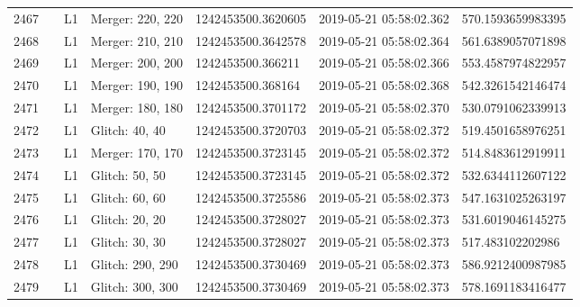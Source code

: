 \begin{longtable}{lllllll}
2467 &                                                    &       L1 &  Merger: 220, 220 &  1242453500.3620605 &  2019-05-21 05:58:02.362 &   570.1593659983395 \\
2468 &                                                    &       L1 &  Merger: 210, 210 &  1242453500.3642578 &  2019-05-21 05:58:02.364 &   561.6389057071898 \\
2469 &                                                    &       L1 &  Merger: 200, 200 &   1242453500.366211 &  2019-05-21 05:58:02.366 &   553.4587974822957 \\
2470 &                                                    &       L1 &  Merger: 190, 190 &   1242453500.368164 &  2019-05-21 05:58:02.368 &   542.3261542146474 \\
2471 &                                                    &       L1 &  Merger: 180, 180 &  1242453500.3701172 &  2019-05-21 05:58:02.370 &   530.0791062339913 \\
2472 &                                                    &       L1 &    Glitch: 40, 40 &  1242453500.3720703 &  2019-05-21 05:58:02.372 &   519.4501658976251 \\
2473 &                                                    &       L1 &  Merger: 170, 170 &  1242453500.3723145 &  2019-05-21 05:58:02.372 &   514.8483612919911 \\
2474 &                                                    &       L1 &    Glitch: 50, 50 &  1242453500.3723145 &  2019-05-21 05:58:02.372 &   532.6344112607122 \\
2475 &                                                    &       L1 &    Glitch: 60, 60 &  1242453500.3725586 &  2019-05-21 05:58:02.373 &   547.1631025263197 \\
2476 &                                                    &       L1 &    Glitch: 20, 20 &  1242453500.3728027 &  2019-05-21 05:58:02.373 &   531.6019046145275 \\
2477 &                                                    &       L1 &    Glitch: 30, 30 &  1242453500.3728027 &  2019-05-21 05:58:02.373 &    517.483102202986 \\
2478 &                                                    &       L1 &  Glitch: 290, 290 &  1242453500.3730469 &  2019-05-21 05:58:02.373 &   586.9212400987985 \\
2479 &                                                    &       L1 &  Glitch: 300, 300 &  1242453500.3730469 &  2019-05-21 05:58:02.373 &   578.1691183416477 \\

\end{longtable}
